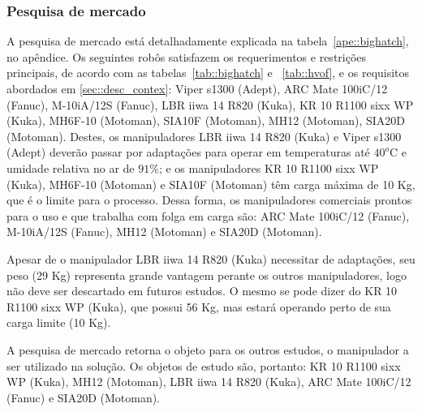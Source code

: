 \subsubsection{Pesquisa de mercado}
A pesquisa de mercado está detalhadamente explicada na
tabela~\ref{ape::bighatch}, no apêndice. Os seguintes robôs satisfazem os
requerimentos e restrições principais, de acordo com as tabelas~\ref{tab::bighatch} e ~\ref{tab::hvof}, e os requisitos abordados
em \ref{sec::desc_contex}: Viper s1300 (Adept), ARC Mate 100iC/12 (Fanuc),
M-10iA/12S (Fanuc), LBR iiwa 14 R820 (Kuka), KR 10 R1100 sixx WP (Kuka), MH6F-10
(Motoman), SIA10F (Motoman), MH12 (Motoman), SIA20D (Motoman). Destes, os
manipuladores LBR iiwa 14 R820 (Kuka) e Viper s1300 (Adept) deverão passar por adaptações para
operar em temperaturas até $40^o$C e umidade relativa no ar de $91\%$; e os
manipuladores KR 10 R1100 sixx WP (Kuka), MH6F-10
(Motoman) e SIA10F (Motoman) têm carga máxima de 10 Kg, que é o limite para o
processo. Dessa forma, os manipuladores comerciais prontos para o uso e que
trabalha com folga em carga são: ARC Mate 100iC/12 (Fanuc), M-10iA/12S (Fanuc),
MH12 (Motoman) e SIA20D (Motoman).

Apesar de o manipulador LBR iiwa 14 R820 (Kuka) necessitar de adaptações, seu
peso (29 Kg) representa grande vantagem perante os outros manipuladores, logo
não deve ser descartado em futuros estudos. O mesmo se pode dizer do KR 10 R1100
sixx WP (Kuka), que possui 56 Kg, mas estará operando perto de sua carga limite
(10 Kg).

A pesquisa de mercado retorna o objeto para os outros estudos, o manipulador a
ser utilizado na solução. Os objetos de estudo são, portanto: KR 10 R1100
sixx WP (Kuka), MH12 (Motoman), LBR iiwa 14 R820 (Kuka), ARC Mate 100iC/12
(Fanuc) e SIA20D (Motoman).


